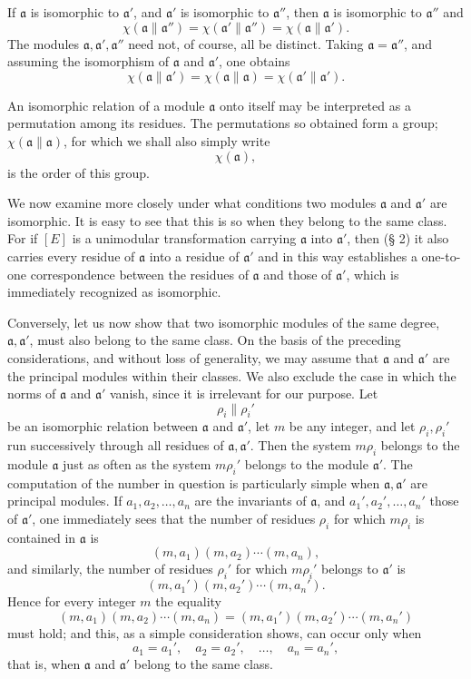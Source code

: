 \documentclass[11pt,a4paper]{article}
\begin{document}
If $\mathfrak a$ is isomorphic to $\mathfrak a'$, and $\mathfrak a'$ is isomorphic to $\mathfrak a''$, then $\mathfrak a$ is isomorphic to $\mathfrak a''$ and
\[
 \chi(\mathfrak a\parallel\mathfrak a'')=
 \chi(\mathfrak a'\parallel\mathfrak a'')=
 \chi(\mathfrak a\parallel\mathfrak a').
\]
The modules $\mathfrak a,\mathfrak a',\mathfrak a''$ need not, of course, all be distinct. Taking $\mathfrak a=\mathfrak a''$, and assuming the isomorphism of $\mathfrak a$ and $\mathfrak a'$, one obtains
\[
 \chi(\mathfrak a\parallel\mathfrak a')=
 \chi(\mathfrak a\parallel\mathfrak a)=
 \chi(\mathfrak a'\parallel\mathfrak a').
\]

An isomorphic relation of a module $\mathfrak a$ onto itself may be interpreted as a permutation among its residues. The permutations so obtained form a group; $\chi(\mathfrak a\parallel\mathfrak a)$, for which we shall also simply write
\[
 \chi(\mathfrak a),
\]
is the order of this group.

We now examine more closely under what conditions two modules $\mathfrak a$ and $\mathfrak a'$ are isomorphic. It is easy to see that this is so when they belong to the same class. For if $[E]$ is a unimodular transformation carrying $\mathfrak a$ into $\mathfrak a'$, then (§ 2) it also carries every residue of $\mathfrak a$ into a residue of $\mathfrak a'$ and in this way establishes a one-to-one correspondence between the residues of $\mathfrak a$ and those of $\mathfrak a'$, which is immediately recognized as isomorphic.

Conversely, let us now show that two isomorphic modules of the same degree, $\mathfrak a,\mathfrak a'$, must also belong to the same class. On the basis of the preceding considerations, and without loss of generality, we may assume that $\mathfrak a$ and $\mathfrak a'$ are the principal modules within their classes. We also exclude the case in which the norms of $\mathfrak a$ and $\mathfrak a'$ vanish, since it is irrelevant for our purpose. Let
\[
 \rho_i\parallel \rho_i'
\]
be an isomorphic relation between $\mathfrak a$ and $\mathfrak a'$, let $m$ be any integer, and let $\rho_i,\rho_i'$ run successively through all residues of $\mathfrak a,\mathfrak a'$. Then the system $m\rho_i$ belongs to the module $\mathfrak a$ just as often as the system $m\rho_i'$ belongs to the module $\mathfrak a'$. The computation of the number in question is particularly simple when $\mathfrak a,\mathfrak a'$ are principal modules. If $a_1,a_2,\ldots,a_n$ are the invariants of $\mathfrak a$, and $a_1',a_2',\ldots,a_n'$ those of $\mathfrak a'$, one immediately sees that the number of residues $\rho_i$ for which $m\rho_i$ is contained in $\mathfrak a$ is
\[
 (m,a_1)(m,a_2)\cdots(m,a_n),
\]
and similarly, the number of residues $\rho_i'$ for which $m\rho_i'$ belongs to $\mathfrak a'$ is
\[
 (m,a_1')(m,a_2')\cdots(m,a_n').
\]
Hence for every integer $m$ the equality
\[
 (m,a_1)(m,a_2)\cdots(m,a_n)=(m,a_1')(m,a_2')\cdots(m,a_n')
\]
must hold; and this, as a simple consideration shows, can occur only when
\[
 a_1=a_1',\quad a_2=a_2',\quad\ldots,\quad a_n=a_n',
\]
that is, when $\mathfrak a$ and $\mathfrak a'$ belong to the same class.
\end{document}
